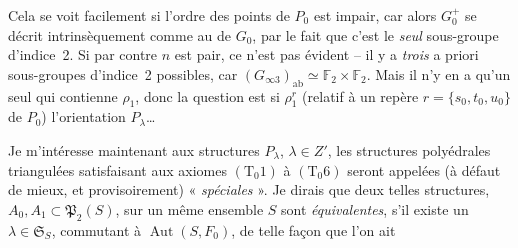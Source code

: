 \documentclass[11pt,a4paper]{article}
\begin{document}
Cela se voit facilement si l'ordre des points de $P_0$ est impair, car alors $G_0^{+}$ se décrit intrinsèquement comme \ill{} au  de $G_0$, par le fait que c'est le \emph{seul} sous-groupe d'indice~2. Si par contre $n$ est pair, ce n'est pas évident -- il y a \emph{trois} a priori sous-groupes d'indice~2 possibles, car $(G_{\infty 3})_{\mathrm{ab}} \simeq \mathbb{F}_2 \times \mathbb{F}_2$. Mais il n'y en a qu'un seul qui contienne $\rho_1$, donc la question est si $\rho_1^{r}$ (relatif à un repère $r = \{s_0, t_0, u_0\}$ de $P_0$)  l'orientation   $P_\lambda$…

Je m'intéresse maintenant aux structures $P_\lambda$, $\lambda \in Z'$,  les structures polyédrales triangulées satisfaisant aux axiomes $(\text{T}_0 1)$ à $(\text{T}_0 6)$ seront appelées (à défaut de mieux, et provisoirement) « \emph{spéciales} ». Je dirais que deux telles structures,  $A_0, A_1 \subset \mathfrak{P}_2(S)$, sur un même ensemble $S$ sont \emph{équivalentes}, s'il existe un $\lambda \in \mathfrak{S}_S$, commutant à $\operatorname{Aut}(S, F_0)$, de telle façon que l'on ait
\end{document}
